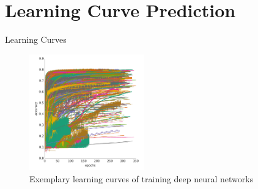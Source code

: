 \section{Learning Curve Prediction}
\begin{frame}{Learning Curves}

\begin{figure}
   \centering
   \includegraphics[width=0.44\textwidth]{../w07_hpo_speedup/images/learningcurve/learning_curve_domhan.png}
   \caption{Exemplary learning curves of training deep neural networks}
\end{figure}




\end{frame}

